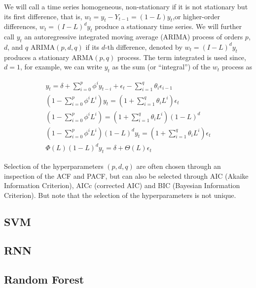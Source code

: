 \documentclass[
  11pt,
]{article}
\begin{document}
We will call a time series homogeneous, non-stationary if it is not
stationary but its first difference, that is,
\(w_{t} = y_{t} - Y_{t-1} =(1 - L)y_{t}\),or higher-order differences,
\(w_{t} =(I- L)^{d}y_{t}\) produce a stationary time series. We will
further call \(y_{t}\) an autoregressive integrated moving average
(\(\mathrm{ARIMA}\)) process of orders \(p\), \(d\), and \(q\)
\(\mathrm{ARIMA}(p, d, q)\) if its \(d\)-th difference, denoted by
\(w_{t} =(I- L)^{d}y_{t}\) produces a stationary \(\mathrm{ARMA}(p, q)\)
process. The term integrated is used since, \(d = 1\), for example, we
can write \(y_{t}\) as the sum (or ``integral'') of the \(w_{t}\)
process as

\begin{gather*}
y_{t} = \delta + \sum\limits_{i=0}^{p}\phi^{i}y_{t- i} + \epsilon_{t} - \sum\limits_{i=1}^{q}\theta_{i}\epsilon_{i-1} \\[8pt]
\left(1 - \sum\limits_{i=0}^{p}\phi^{i}L^{i}\right)y_{t} = \left(1 + \sum\limits_{i=1}^{q}\theta_{i}L^{i}\right)\epsilon_{t} \\[8pt]
\left(1 - \sum\limits_{i=0}^{p}\phi^{i}L^{i}\right) = \left(1 + \sum\limits_{i=1}^{q}\theta_{i}L^{i}\right)\left(1 - L\right)^{d} \\[8pt]
\left(1 - \sum\limits_{i=0}^{p}\phi^{i}L^{i}\right)\left(1 - L\right)^{d}y_{t} = \left(1 + \sum\limits_{i=1}^{q}\theta_{i}L^{i}\right)\epsilon_{t} \\[8pt]
\Phi(L)(1 - L)^{d}y_{t} = \delta + \Theta(L)\epsilon_{t}
\end{gather*}

Selection of the hyperparameters \((p, d, q)\) are often chosen through
an inspection of the ACF and PACF, but can also be selected through AIC
(Akaike Information Criterion), AICc (corrected AIC) and BIC (Bayesian
Information Criterion). But note that the selection of the
hyperparameters is not unique.

\hypertarget{svm}{%
\subsection{SVM}\label{svm}}

\hypertarget{rnn}{%
\subsection{RNN}\label{rnn}}

\hypertarget{random-forest}{%
\subsection{Random Forest}\label{random-forest}}
\end{document}
